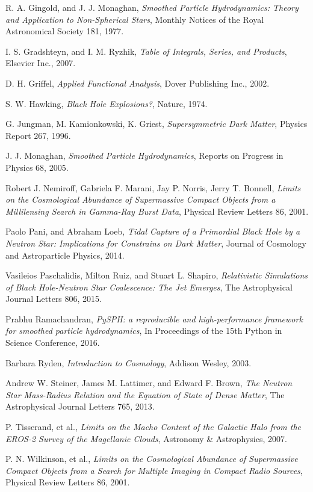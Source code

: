 \begin{thebibliography}{99}
R. A. Gingold, and J. J. Monaghan, \emph{Smoothed Particle Hydrodynamics: Theory and Application to Non-Spherical Stars}, Monthly Notices of the Royal Astronomical Society 181, 1977.

I. S. Gradshteyn, and I. M. Ryzhik, \emph{Table of Integrals, Series, and Products}, Elsevier Inc., 2007.

D. H. Griffel, \emph{Applied Functional Analysis}, Dover Publishing Inc., 2002.

S. W. Hawking, \emph{Black Hole Explosions?}, Nature, 1974.

G. Jungman, M. Kamionkowski, K. Griest, \emph{Supersymmetric Dark Matter}, Physics Report 267, 1996.

J. J. Monaghan, \emph{Smoothed Particle Hydrodynamics}, Reports on Progress in Physics 68, 2005.

Robert J. Nemiroff, Gabriela F. Marani, Jay P. Norris, Jerry T. Bonnell, \emph{Limits on the Cosmological Abundance of Supermassive Compact Objects from a Millilensing Search in Gamma-Ray Burst Data}, Physical Review Letters 86, 2001.

Paolo Pani, and Abraham Loeb, \emph{Tidal Capture of a Primordial Black Hole by a Neutron Star: Implications for Constrains on Dark Matter}, Journal of Cosmology and Astroparticle Physics, 2014.

Vasileios Paschalidis, Milton Ruiz, and Stuart L. Shapiro, \emph{Relativistic Simulations of Black Hole-Neutron Star Coalescence: The Jet Emerges}, The Astrophysical Journal Letters 806, 2015.

Prabhu Ramachandran, \emph{PySPH: a reproducible and high-performance framework for smoothed particle hydrodynamics}, In Proceedings of the 15th Python in Science Conference, 2016.

Barbara Ryden, \emph{Introduction to Cosmology}, Addison Wesley, 2003.

Andrew W. Steiner, James M. Lattimer, and Edward F. Brown, \emph{The Neutron Star Mass-Radius Relation and the Equation of State of Dense Matter}, The Astrophysical Journal Letters 765, 2013.

P. Tisserand, et al., \emph{Limits on the Macho Content of the Galactic Halo from the EROS-2 Survey of the Magellanic Clouds}, Astronomy \& Astrophysics, 2007.

P. N. Wilkinson, et al., \emph{Limits on the Cosmological Abundance of Supermassive Compact Objects from a Search for Multiple Imaging in Compact Radio Sources}, Physical Review Letters 86, 2001.

\end{thebibliography}